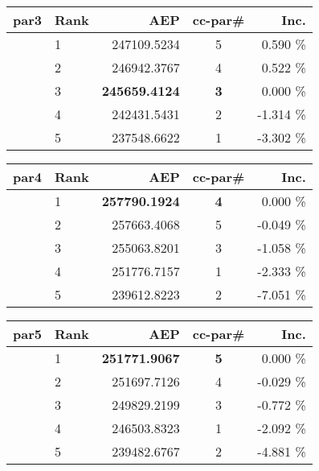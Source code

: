		\begin{table}[H]
			\begin{center}
				\begin{tabular}{r l r c r}
					par3 	& Rank	& AEP					& cc-par\#	& Inc.\\
					\hline
							& 1		& 247109.5234			& 5 		& 0.590 \%\\	
							& 2		& 246942.3767			& 4 		& 0.522 \%\\
							& 3		& \textbf{245659.4124}	& \textbf{3}& 0.000 \%\\
							& 4		& 242431.5431			& 2 		&-1.314 \%\\
							& 5		& 237548.6622			& 1 		&-3.302 \%\\
					\hline
				\end{tabular}
			\end{center}
		\end{table}

		\begin{table}[H]
			\begin{center}
				\begin{tabular}{r l r c r}
					par4 	& Rank	& AEP					& cc-par\#	& Inc.\\
					\hline
							& 1		& \textbf{257790.1924}	& \textbf{4}& 0.000 \%\\	
							& 2		& 257663.4068			& 5 		&-0.049 \%\\
							& 3		& 255063.8201			& 3 		&-1.058 \%\\
							& 4		& 251776.7157			& 1 		&-2.333 \%\\
							& 5		& 239612.8223			& 2 		&-7.051 \%\\
					\hline
				\end{tabular}
			\end{center}
		\end{table}

		\begin{table}[H]
			\begin{center}
				\begin{tabular}{r l r c r}
					par5 	& Rank	& AEP					& cc-par\#	& Inc.\\
					\hline
							& 1		& \textbf{251771.9067}	& \textbf{5}& 0.000 \%\\	
							& 2		& 251697.7126			& 4 		&-0.029 \%\\
							& 3		& 249829.2199			& 3 		&-0.772 \%\\
							& 4		& 246503.8323			& 1 		&-2.092 \%\\
							& 5		& 239482.6767			& 2 		&-4.881 \%\\
					\hline
				\end{tabular}
			\end{center}
		\end{table}

